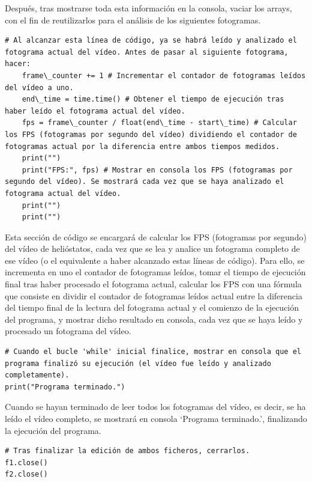 Después, tras mostrarse toda esta información en la consola, vaciar los arrays, con el fin de reutilizarlos para el análisis de los siguientes fotogramas.\\[20pt]

\begin{lstlisting}
# Al alcanzar esta línea de código, ya se habrá leído y analizado el fotograma actual del vídeo. Antes de pasar al siguiente fotograma, hacer:
    frame\_counter += 1 # Incrementar el contador de fotogramas leídos del vídeo a uno.
    end\_time = time.time() # Obtener el tiempo de ejecución tras haber leído el fotograma actual del vídeo.
    fps = frame\_counter / float(end\_time - start\_time) # Calcular los FPS (fotogramas por segundo del vídeo) dividiendo el contador de fotogramas actual por la diferencia entre ambos tiempos medidos.
    print("")
    print("FPS:", fps) # Mostrar en consola los FPS (fotogramas por segundo del vídeo). Se mostrará cada vez que se haya analizado el fotograma actual del vídeo.
    print("")
    print("")
\end{lstlisting}

Esta sección de código se encargará de calcular los FPS (fotogramas por segundo) del vídeo de helióstatos, cada vez que se lea y analice un fotograma completo de ese vídeo (o el equivalente a haber alcanzado estas líneas de código). Para ello, se incrementa en uno el contador de fotogramas leídos, tomar el tiempo de ejecución final tras haber procesado el fotograma actual, calcular los FPS con una fórmula que consiste en dividir el contador de fotogramas leídos actual entre la diferencia del tiempo final de la lectura del fotograma actual y el comienzo de la ejecución del programa, y mostrar dicho resultado en consola, cada vez que se haya leído y procesado un fotograma del vídeo.\\[20pt]

\begin{lstlisting}
# Cuando el bucle 'while' inicial finalice, mostrar en consola que el programa finalizó su ejecución (el vídeo fue leído y analizado completamente).
print("Programa terminado.")
\end{lstlisting}

Cuando se hayan terminado de leer todos los fotogramas del vídeo, es decir, se ha leído el vídeo completo, se mostrará en consola ‘Programa terminado.’, finalizando la ejecución del programa.\\[20pt]

\begin{lstlisting}
# Tras finalizar la edición de ambos ficheros, cerrarlos.
f1.close()
f2.close()
\end{lstlisting}

